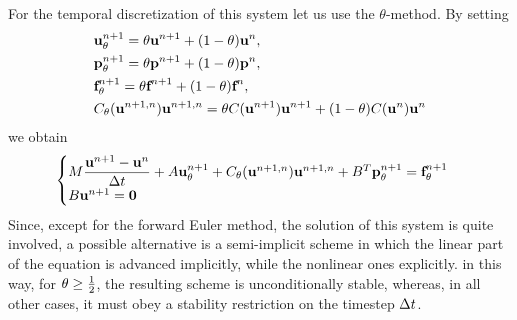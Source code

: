 For the temporal discretization of this system let us use the \(\theta\)-method. By setting
\begin{align*}
    &\textbf{u}_\theta^{n+1} = \theta \textbf{u}^{n+1} + (1-\theta)\textbf{u}^n, \\
    &\textbf{p}_\theta^{n+1} = \theta \textbf{p}^{n+1} + (1-\theta)\textbf{p}^n, \\
    &\textbf{f}_\theta^{n+1} = \theta \textbf{f}^{n+1} + (1-\theta)\textbf{f}^n, \\
    &C_\theta(\textbf{u}^{n+1,n})\textbf{u}^{n+1,n} = \theta C(\textbf{u}^{n+1})\textbf{u}^{n+1} + (1-\theta)C(\textbf{u}^{n})\textbf{u}^{n}
\end{align*}
we obtain 
\begin{equation}
    \begin{cases}
        M\dfrac{\textbf{u}^{n+1}-\textbf{u}^n}{\Delta t} + A\textbf{u}_\theta^{n+1} + C_\theta(\textbf{u}^{n+1,n})\textbf{u}^{n+1,n} + B^T\textbf{p}_\theta^{n+1} = \textbf{f}_\theta^{n+1} \\
        B\textbf{u}^{n+1} = \textbf{0}
    \end{cases}
    \label{59_slide_ns}
\end{equation}
Since, except for the forward Euler method, the solution of this system is quite involved, a possible alternative is a semi-implicit scheme in which the linear part of the equation is advanced implicitly, while the nonlinear ones explicitly. in this way, for \(\theta \geq \frac{1}{2}\), the resulting scheme is unconditionally stable, whereas, in all other cases, it must obey a stability restriction on the timestep \(\Delta t\). 
